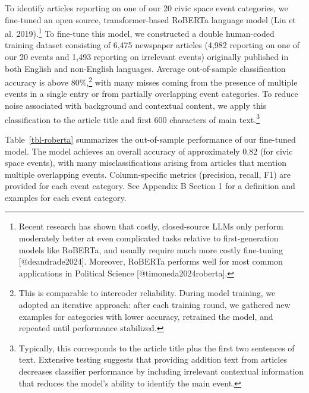 \documentclass[
  letterpaper,
  DIV=11,
  numbers=noendperiod]{scrartcl}
\begin{document}
To identify articles reporting on one of our 20 civic space event
categories, we fine-tuned an open source, transformer-based RoBERTa
language model (Liu et al.
2019).\footnote{Recent research has shown that costly, closed-source LLMs only perform moderately better at even complicated tasks relative to first-generation models like RoBERTa, and usually require much more costly fine-tuning [@deandrade2024]. Moreover, RoBERTa performs well for most common applications in Political Science [@timoneda2024roberta].}
To fine-tune this model, we constructed a double human-coded training
dataset consisting of 6,475 newspaper articles (4,982 reporting on one
of our 20 events and 1,493 reporting on irrelevant events) originally
published in both English and non-English languages. Average
out-of-sample classification accuracy is above
80\%,\footnote{This is comparable to intercoder reliability. During model training, we adopted an iterative approach: after each training round, we gathered new examples for categories with lower accuracy, retrained the model, and repeated until performance stabilized.}
with many misses coming from the presence of multiple events in a single
entry or from partially overlapping event categories. To reduce noise
associated with background and contextual content, we apply this
classification to the article title and first 600 characters of main
text.\footnote{Typically, this corresponds to the article title plus the first two sentences of text. Extensive testing suggests that providing addition text from articles decreases classifier performance by including irrelevant contextual information that reduces the model's ability to identify the main event.}

Table~\ref{tbl-roberta} summarizes the out-of-sample performance of our
fine-tuned model. The model achieves an overall accuracy of
approximately 0.82 (for civic space events), with many
misclassifications arising from articles that mention multiple
overlapping events. Column-specific metrics (precision, recall, F1) are
provided for each event category. See Appendix B Section 1 for a
definition and examples for each event category.
\end{document}
